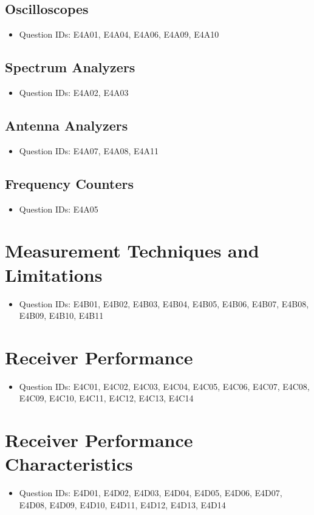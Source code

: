 \documentclass{book}
\begin{document}
\subsection{Oscilloscopes}
\begin{itemize}
    \item Question IDs: E4A01, E4A04, E4A06, E4A09, E4A10
\end{itemize}
\subsection{Spectrum Analyzers}
\begin{itemize}
    \item Question IDs: E4A02, E4A03
\end{itemize}
\subsection{Antenna Analyzers}
\begin{itemize}
    \item Question IDs: E4A07, E4A08, E4A11
\end{itemize}
\subsection{Frequency Counters}
\begin{itemize}
    \item Question IDs: E4A05
\end{itemize}

\section{Measurement Techniques and Limitations}
\begin{itemize}
    \item Question IDs: E4B01, E4B02, E4B03, E4B04, E4B05, E4B06, E4B07, E4B08, E4B09, E4B10, E4B11
\end{itemize}

\section{Receiver Performance}
\begin{itemize}
    \item Question IDs: E4C01, E4C02, E4C03, E4C04, E4C05, E4C06, E4C07, E4C08, E4C09, E4C10, E4C11, E4C12, E4C13, E4C14
\end{itemize}

\section{Receiver Performance Characteristics}
\begin{itemize}
    \item Question IDs: E4D01, E4D02, E4D03, E4D04, E4D05, E4D06, E4D07, E4D08, E4D09, E4D10, E4D11, E4D12, E4D13, E4D14
\end{itemize}
\end{document}
